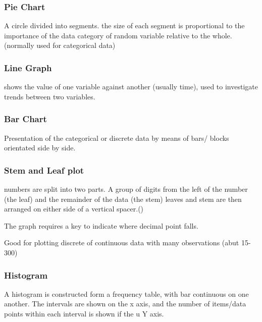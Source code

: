 \documentclass[]{article}
\begin{document}
\hypertarget{pie-chart}{%
\subsubsection{Pie Chart}\label{pie-chart}}

A circle divided into segments. the size of each segment is proportional
to the importance of the data category of random variable relative to
the whole. (normally used for categorical data)

\hypertarget{line-graph}{%
\subsubsection{Line Graph}\label{line-graph}}

shows the value of one variable against another (usually time), used to
investigate trends between two variables.

\hypertarget{bar-chart}{%
\subsubsection{Bar Chart}\label{bar-chart}}

Presentation of the categorical or discrete data by means of bars/
blocks orientated side by side.

\hypertarget{stem-and-leaf-plot}{%
\subsubsection{Stem and Leaf plot}\label{stem-and-leaf-plot}}

numbers are split into two parts. A group of digits from the left of the
number (the leaf) and the remainder of the data (the stem) leaves and
stem are then arranged on either side of a vertical spacer.(\textbar{})

The graph requires a key to indicate where decimal point falls.

Good for plotting discrete of continuous data with many observations
(abut 15-300)

\hypertarget{histogram}{%
\subsubsection{Histogram}\label{histogram}}

A histogram is constructed form a frequency table, with bar continuous
on one another. The intervals are shown on the x axis, and the number of
items/data points within each interval is shown if the u Y axis.
\end{document}
